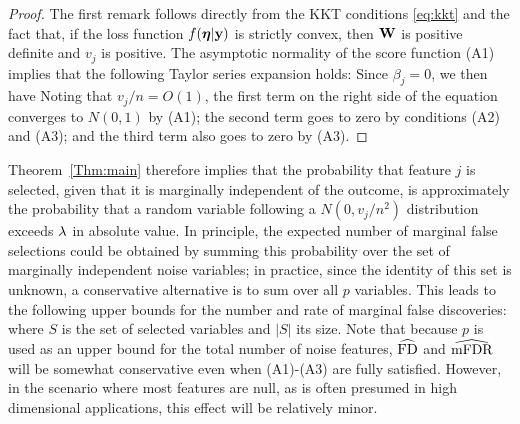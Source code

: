 \begin{proof}
  The first remark follows directly from the KKT conditions \eqref{eq:kkt} and the fact that, if the loss function $f(\boldsymbol{\eta}|\mathbf{y})$ is strictly convex, then $\mathbf{W}$ is positive definite and $v_j$ is positive.  The asymptotic normality of the score function (A1) implies that the following Taylor series expansion holds:
Since $\beta_j=0$, we then have
Noting that $v_j/n=O(1)$, the first term on the right side of the equation converges to $N(0,1)$ by (A1); the second term goes to zero by conditions (A2) and (A3); and the third term also goes to zero by (A3).
\end{proof}

Theorem~\ref{Thm:main} therefore implies that the probability that feature $j$ is selected, given that it is marginally independent of the outcome, is approximately the probability that a random variable following a $N(0, v_j/n^2)$ distribution exceeds $\lambda$ in absolute value.
In principle, the expected number of marginal false selections could be obtained by summing this probability over the set of marginally independent noise variables; in practice, since the identity of this set is unknown, a conservative alternative is to sum over all $p$ variables.
This leads to the following upper bounds for the number and rate of marginal false discoveries:
where $S$ is the set of selected variables and $|S|$ its size.  Note that because $p$ is used as an upper bound for the total number of noise features, $\widehat{\textrm{FD}}$ and $\widehat{\textrm{mFDR}}$ will be somewhat conservative even when (A1)-(A3) are fully satisfied.  However, in the scenario where most features are null, as is often presumed in high dimensional applications, this effect will be relatively minor.

